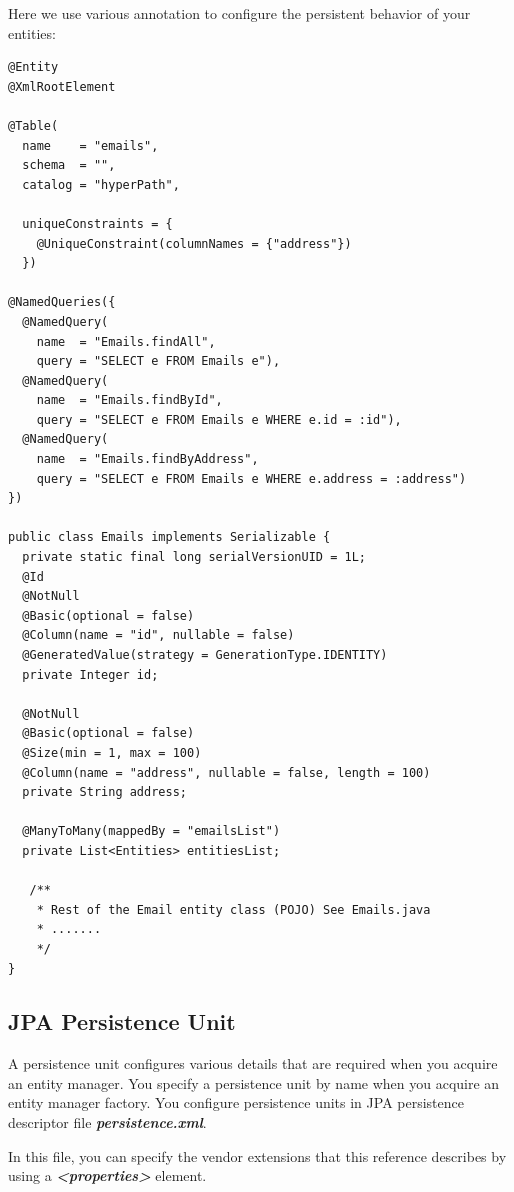 Here we use various annotation to configure the persistent behavior of your entities:
\begin{lstlisting}[label=Emails JPA entity,caption=Emails JPA entity]
@Entity
@XmlRootElement

@Table(
  name    = "emails",
  schema  = "",
  catalog = "hyperPath",

  uniqueConstraints = {
    @UniqueConstraint(columnNames = {"address"})
  })

@NamedQueries({
  @NamedQuery(
    name  = "Emails.findAll",
    query = "SELECT e FROM Emails e"),
  @NamedQuery(
    name  = "Emails.findById",
    query = "SELECT e FROM Emails e WHERE e.id = :id"),
  @NamedQuery(
    name  = "Emails.findByAddress",
    query = "SELECT e FROM Emails e WHERE e.address = :address")
})

public class Emails implements Serializable {
  private static final long serialVersionUID = 1L;
  @Id
  @NotNull
  @Basic(optional = false)
  @Column(name = "id", nullable = false)
  @GeneratedValue(strategy = GenerationType.IDENTITY)
  private Integer id;

  @NotNull
  @Basic(optional = false)
  @Size(min = 1, max = 100)
  @Column(name = "address", nullable = false, length = 100)
  private String address;

  @ManyToMany(mappedBy = "emailsList")
  private List<Entities> entitiesList;

   /**
    * Rest of the Email entity class (POJO) See Emails.java
  	* .......
  	*/
}
\end{lstlisting}

\subsection{JPA Persistence Unit}
A persistence unit configures various details that are required when you acquire an entity manager. You specify a persistence unit by name when you acquire an entity manager factory. You configure persistence units in JPA persistence descriptor file \textbf{\textit{\textsf{persistence.xml}}}.

In this file, you can specify the vendor extensions that this reference describes by using a \textit{\textbf{\textsf{<properties>}}} element.

